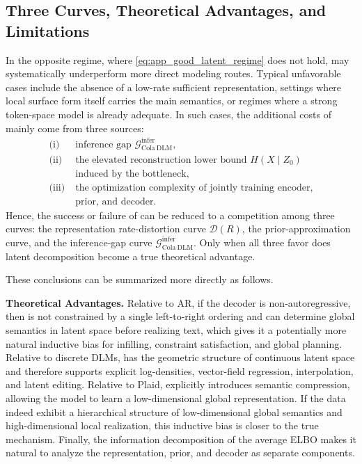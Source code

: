 \subsection{Three Curves, Theoretical Advantages, and Limitations}
\label{app:three_curves}

In the opposite regime, where \eqref{eq:app_good_latent_regime} does not hold, \method may systematically underperform more direct modeling routes. Typical unfavorable cases include the absence of a low-rate sufficient representation, settings where local surface form itself carries the main semantics, or regimes where a strong token-space model is already adequate. In such cases, the additional costs of \method mainly come from three sources:
\begin{equation}
\begin{aligned}
\text{(i)}\;& \text{inference gap } \mathcal G^{\mathrm{infer}}_{\mathrm{Cola\ DLM}}, \\
\text{(ii)}\;& \text{the elevated reconstruction lower bound } H(X \mid Z_0) \\
&\text{induced by the bottleneck}, \\
\text{(iii)}\;& \text{the optimization complexity of jointly training encoder,} \\
&\text{prior, and decoder}.
\end{aligned}
\label{eq:app_ldlm_three_costs}
\end{equation}
Hence, the success or failure of \method can be reduced to a competition among three curves: the representation rate-distortion curve $\mathcal D(R)$, the prior-approximation curve, and the inference-gap curve $\mathcal G^{\mathrm{infer}}_{\mathrm{Cola\ DLM}}$. Only when all three favor \method does latent decomposition become a true theoretical advantage.

These conclusions can be summarized more directly as follows.

\textbf{Theoretical Advantages.}
Relative to AR, if the decoder is non-autoregressive, then \method is not constrained by a single left-to-right ordering and can determine global semantics in latent space before realizing text, which gives it a potentially more natural inductive bias for infilling, constraint satisfaction, and global planning. Relative to discrete DLMs, \method has the geometric structure of continuous latent space and therefore supports explicit log-densities, vector-field regression, interpolation, and latent editing. Relative to Plaid, \method explicitly introduces semantic compression, allowing the model to learn a low-dimensional global representation. If the data indeed exhibit a hierarchical structure of low-dimensional global semantics and high-dimensional local realization, this inductive bias is closer to the true mechanism. Finally, the information decomposition of the average ELBO makes it natural to analyze the representation, prior, and decoder as separate components.

